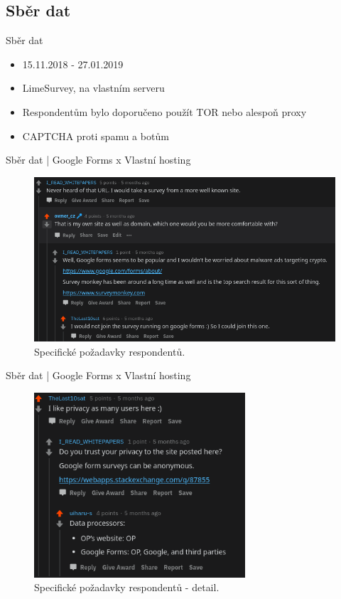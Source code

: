 \documentclass{beamer}
\begin{document}
\begin{darkframes}
    \subsection{Sběr dat}
    \begin{frame}{Sběr dat}
     \begin{itemize}
     \item 15.11.2018 - 27.01.2019
     \item LimeSurvey, na vlastním serveru
     \item Respondentům bylo doporučeno použít TOR nebo alespoň proxy
     \item CAPTCHA proti spamu a botům
     \end{itemize}
    \end{frame}
        \begin{frame}{Sběr dat | Google Forms x Vlastní hosting}
    	\begin{figure}
  \centering
  \includegraphics[width=1\textwidth]{survey-discussion.png}
  \caption{Specifické požadavky respondentů.}  \label{fig:xray}
\end{figure}
    \end{frame}
    \begin{frame}{Sběr dat | Google Forms x Vlastní hosting}
    	\begin{figure}
  \centering
  \includegraphics[width=0.7\textwidth]{survey-website.png}
  \caption{Specifické požadavky respondentů - detail.}  \label{fig:xray}
\end{figure}
    \end{frame}

\end{darkframes}
\end{document}
